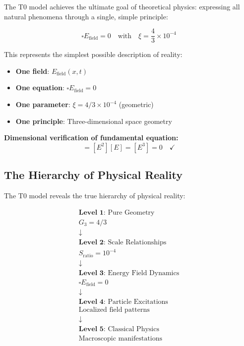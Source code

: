 \documentclass[12pt,a4paper]{report}
\begin{document}
The T0 model achieves the ultimate goal of theoretical physics: expressing all natural phenomena through a single, simple principle:

\begin{equation}
	\boxed{\square E_{\text{field}} = 0 \quad \text{with} \quad \xi = \frac{4}{3} \times 10^{-4}}
\end{equation}

This represents the simplest possible description of reality:
\begin{itemize}
	\item \textbf{One field}: $E_{\text{field}}(x,t)$
	\item \textbf{One equation}: $\square E_{\text{field}} = 0$
	\item \textbf{One parameter}: $\xi = 4/3 \times 10^{-4}$ (geometric)
	\item \textbf{One principle}: Three-dimensional space geometry
\end{itemize}

\textbf{Dimensional verification of fundamental equation:}
\begin{equation}
	[\square E_{\text{field}}] = [E^2][E] = [E^3] = 0 \quad \checkmark
\end{equation}

\subsection{The Hierarchy of Physical Reality}
\label{subsec:hierarchy_reality}

The T0 model reveals the true hierarchy of physical reality:

\begin{equation}
	\begin{array}{c}
		\textbf{Level 1:} \text{ Pure Geometry} \\
		G_3 = 4/3 \\
		\downarrow \\
		\textbf{Level 2:} \text{ Scale Relationships} \\
		S_{\text{ratio}} = 10^{-4} \\
		\downarrow \\
		\textbf{Level 3:} \text{ Energy Field Dynamics} \\
		\square E_{\text{field}} = 0 \\
		\downarrow \\
		\textbf{Level 4:} \text{ Particle Excitations} \\
		\text{Localized field patterns} \\
		\downarrow \\
		\textbf{Level 5:} \text{ Classical Physics} \\
		\text{Macroscopic manifestations}
	\end{array}
\end{equation}
\end{document}
